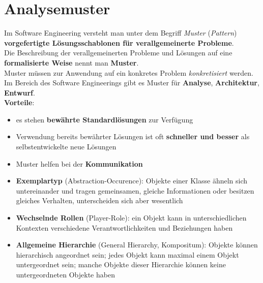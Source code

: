 \section{Analysemuster}

\begin{tcolorbox}[title=Analysemuster]
    Im Software Engineering versteht man unter dem Begriff \textit{Muster} (\textit{Pattern}) \textbf{vorgefertigte Lösungsschablonen für verallgemeinerte Probleme}.\\
    Die Beschreibung der verallgemeinerten Probleme und Lösungen auf eine \textbf{formalisierte Weise} nennt man \textbf{Muster}.\\
    Muster müssen zur Anwendung auf ein konkretes Problem \textit{konkretisiert} werden.\\
    Im Bereich des Software Engineerings gibt es Muster für \textbf{Analyse}, \textbf{Architektur}, \textbf{Entwurf}.\\

    \noindent
    \textbf{Vorteile}:
    \begin{itemize}
        \item es stehen \textbf{bewährte Standardlösungen} zur Verfügung
        \item Verwendung bereits bewährter Lösungen ist oft \textbf{schneller und besser} als selbstentwickelte neue Lösungen
        \item Muster helfen bei der \textbf{Kommunikation}
    \end{itemize}
\end{tcolorbox}

\begin{tcolorbox}[title=Beispiele]
    \begin{itemize}
        \item \textbf{Exemplartyp} (Abstraction-Occurence): Objekte einer Klasse ähneln sich untereinander und tragen gemeinsamen, gleiche Informationen oder besitzen gleiches  Verhalten, unterscheiden sich aber wesentlich
        \item \textbf{Wechselnde Rollen} (Player-Role): ein Objekt kann in unterschiedlichen Kontexten verschiedene Verantwortlichkeiten und Beziehungen haben
        \item \textbf{Allgemeine Hierarchie} (General Hierarchy, Kompositum): Objekte können hierarchisch angeordnet sein;
         jedes Objekt kann maximal einem Objekt untergeordnet sein;
         manche Objekte dieser Hierarchie können keine untergeordneten Objekte haben
    \end{itemize}
\end{tcolorbox}

